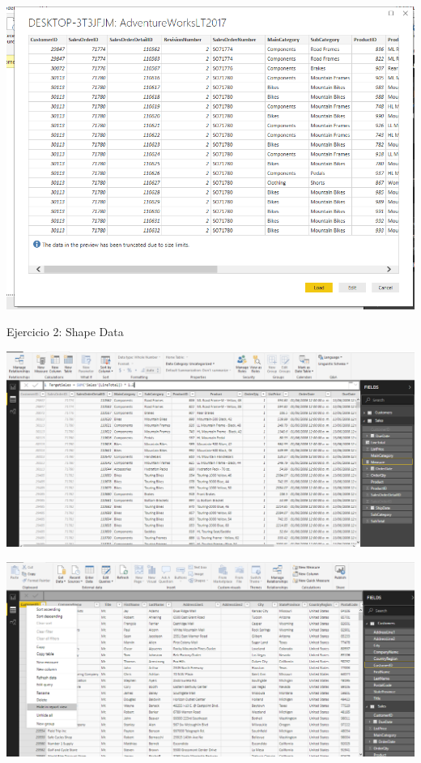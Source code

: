 	\begin{center}
	\includegraphics[width=15cm]{./Imagenes/EJER1T1(4)}
	\end{center}
	\newpage
Ejercicio 2: Shape Data\\
	\begin{center}
	\includegraphics[width=15cm]{./Imagenes/EJER1T2(1)}
	\end{center}	

	

	\begin{center}
	\includegraphics[width=15cm]{./Imagenes/EJER1T2(3)}
	\end{center}	
\newpage

